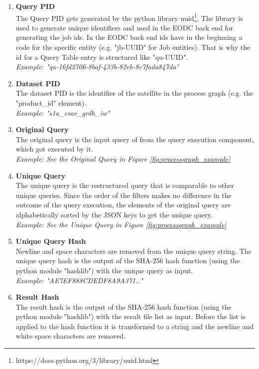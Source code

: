 \documentclass[draft,final]{vutinfth} %
\begin{document}
\begin{enumerate}
	\item \textbf{Query PID} \\
	The Query PID gets generated by the python library uuid\footnote{https://docs.python.org/3/library/uuid.html}. The library is used to generate unique identifiers and used in the EODC back end for generating the job ids. In the EODC back end ids have in the beginning a code for the specific entity (e.g. "jb-UUID" for Job entities). That is why the id for a Query Table entry is structured like "qu-UUID". \\
	\textit{Example: "qu-16fd2706-8baf-433b-82eb-8c7fada847da"}
	\item \textbf{Dataset PID} \\
	The dataset PID is the identifier of the satellite in the process graph (e.g. the "product\_id" element). \\
	\textit{Example: "s1a\_csar\_grdh\_iw"}	    	
	\item\textbf{Original Query} \\
	The original query is the input query of from the query execution component, which got executed by it.  \\ 
	\textit{Example: See the Original Query in Figure \ref{fig:processgraph_example}}	 
	\item \textbf{Unique Query} \\
	The unique query is the restructured query that is comparable to other unique queries. Since the order of the filters makes no difference in the outcome of the query execution, the elements of the original query are alphabetically sorted by the JSON keys to get the unique query. \\
	\textit{Example: See the Unique Query in Figure \ref{fig:processgraph_example}}	  	 	
	\item \textbf{Unique Query Hash} \\ 
	Newline and space characters are removed from the unique query string. The unique query hash is the output of the SHA-256 hash function (using the python module "hashlib") with the unique query as input.  \\
	\textit{Example: "AE7EF888CDEDF8A9A371\dots"} 
	\item \textbf{Result Hash} \\
	The result hash is the output of the SHA-256 hash function (using the python module "hashlib") with the result file list as input. Before the list is applied to the hash function it is transformed to a string and the newline and white space characters are removed. \\

\end{enumerate}
\end{document}

